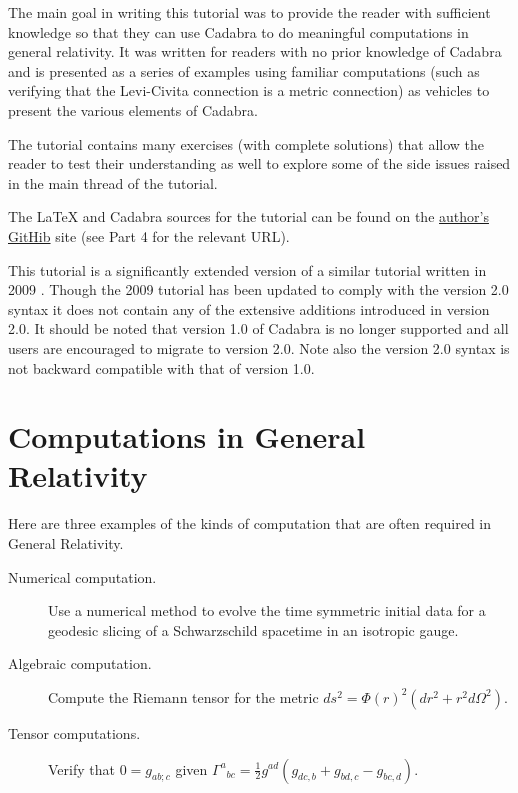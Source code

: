 \documentclass[a4paper,12pt]{article}
\numberwithin{equation}{section}%
\begin{document}
The main goal in writing this tutorial was to provide the reader with sufficient knowledge
so that they can use Cadabra \cite{peeters:2017-01,peeters:2017-02} to do meaningful
computations in general relativity. It was written for readers with no prior knowledge of
Cadabra and is presented as a series of examples using familiar computations (such as
verifying that the Levi-Civita connection is a metric connection) as vehicles to present the
various elements of Cadabra.

The tutorial contains many exercises (with complete solutions) that allow the reader to test
their understanding as well to explore some of the side issues raised in the main thread of
the tutorial.

The LaTeX and Cadabra sources for the tutorial can be found on the
\href{https://github.com/leo-brewin/cadabra-tutorial}{author's GitHib} site
(see Part 4 for the relevant URL).

This tutorial is a significantly extended version of a similar tutorial written in 2009
\cite{brewin:2009-02}. Though the 2009 tutorial has been updated to comply with the
version 2.0 syntax it does not contain any of the extensive additions introduced in version
2.0. It should be noted that version 1.0 of Cadabra is no longer supported and all users are
encouraged to migrate to version 2.0. Note also the version 2.0 syntax is not backward
compatible with that of version 1.0.

\clearpage

\section*{Computations in General Relativity}

Here are three examples of the kinds of computation that are often required in General
Relativity.

\begin{description}
\item[Numerical computation.]\hfil\break\vskip-15pt
Use a numerical method to evolve the time symmetric initial data for a geodesic slicing of a
Schwarzschild spacetime in an isotropic gauge.

\item[Algebraic computation.]\hfil\break\vskip-15pt
Compute the Riemann tensor for the metric $ds^2=\Phi(r)^2\left(dr^2+r^2d\Omega^2\right)$.

\item[Tensor computations.]\hfil\break\vskip-15pt
Verify that $0=g_{ab;c}$ given
$\Gamma^{a}{}_{bc} = \frac{1}{2}g^{ad}\left(g_{dc,b} + g_{bd,c} - g_{bc,d}\right)$.
\end{description}
\end{document}
